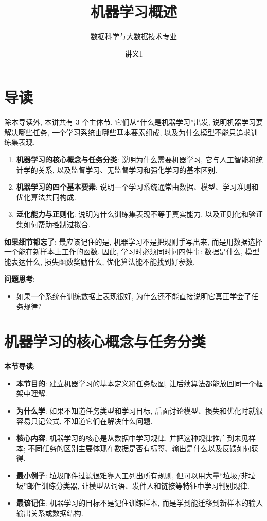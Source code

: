 \documentclass{../nndlcourse}
\begin{document}
\title{机器学习概述}
\author{数据科学与大数据技术专业}
\date{讲义1}
\maketitle

\section{导读}

除本导读外, 本讲共有 3 个主体节. 它们从“什么是机器学习”出发, 说明机器学习要解决哪些任务, 一个学习系统由哪些基本要素组成, 以及为什么模型不能只追求训练集表现.

\begin{enumerate}
  \item \textbf{机器学习的核心概念与任务分类}: 说明为什么需要机器学习, 它与人工智能和统计学的关系, 以及监督学习、无监督学习和强化学习的基本区别.
  \item \textbf{机器学习的四个基本要素}: 说明一个学习系统通常由数据、模型、学习准则和优化算法共同构成.
  \item \textbf{泛化能力与正则化}: 说明为什么训练集表现不等于真实能力, 以及正则化和验证集如何帮助控制过拟合.
\end{enumerate}

\textbf{如果细节都忘了}: 最应该记住的是, 机器学习不是把规则手写出来, 而是用数据选择一个能在新样本上工作的函数. 因此, 学习时必须同时问四件事: 数据是什么, 模型能表达什么, 损失函数奖励什么, 优化算法能不能找到好参数.

\textbf{问题思考}:

\begin{itemize}
  \item 如果一个系统在训练数据上表现很好, 为什么还不能直接说明它真正学会了任务规律?
\end{itemize}

\section{机器学习的核心概念与任务分类}

\textbf{本节导读}:
\begin{itemize}
  \item \textbf{本节目的}: 建立机器学习的基本定义和任务版图, 让后续算法都能放回同一个框架中理解.
  \item \textbf{为什么学}: 如果不知道任务类型和学习目标, 后面讨论模型、损失和优化时就很容易只记公式, 不知道它们在解决什么问题.
  \item \textbf{核心内容}: 机器学习的核心是从数据中学习规律, 并把这种规律推广到未见样本; 不同任务的区别主要体现在数据是否有标签、输出是什么以及反馈如何获得.
  \item \textbf{最小例子}: 垃圾邮件过滤很难靠人工列出所有规则, 但可以用大量“垃圾/非垃圾”邮件训练分类器, 让模型从词语、发件人和链接等特征中学习判别规律.
  \item \textbf{最该记住}: 机器学习的目标不是记住训练样本, 而是学到能迁移到新样本的输入输出关系或数据结构.
\end{itemize}
\end{document}
